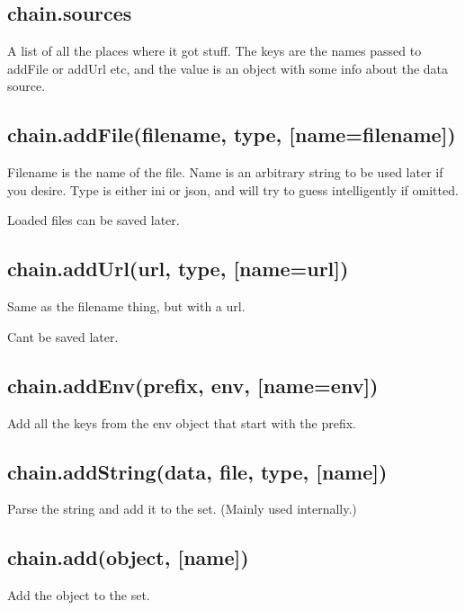 \subsection*{chain.\+sources}

A list of all the places where it got stuff. The keys are the names passed to add\+File or add\+Url etc, and the value is an object with some info about the data source.

\subsection*{chain.\+add\+File(filename, type, \mbox{[}name=filename\mbox{]})}

Filename is the name of the file. Name is an arbitrary string to be used later if you desire. Type is either \textquotesingle{}ini\textquotesingle{} or \textquotesingle{}json\textquotesingle{}, and will try to guess intelligently if omitted.

Loaded files can be saved later.

\subsection*{chain.\+add\+Url(url, type, \mbox{[}name=url\mbox{]})}

Same as the filename thing, but with a url.

Can\textquotesingle{}t be saved later.

\subsection*{chain.\+add\+Env(prefix, env, \mbox{[}name=\textquotesingle{}env\textquotesingle{}\mbox{]})}

Add all the keys from the env object that start with the prefix.

\subsection*{chain.\+add\+String(data, file, type, \mbox{[}name\mbox{]})}

Parse the string and add it to the set. (Mainly used internally.)

\subsection*{chain.\+add(object, \mbox{[}name\mbox{]})}

Add the object to the set.

